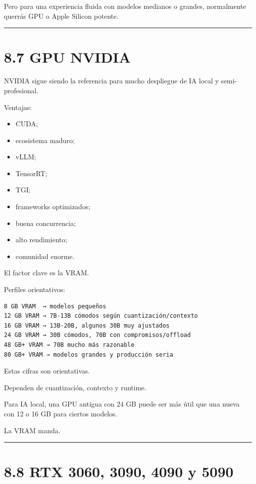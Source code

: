 Pero para una experiencia fluida con modelos medianos o grandes,
normalmente querrás GPU o Apple Silicon potente.

\begin{center}\rule{0.5\linewidth}{0.5pt}\end{center}

\section{8.7 GPU NVIDIA}\label{gpu-nvidia}

NVIDIA sigue siendo la referencia para mucho despliegue de IA local y
semi-profesional.

Ventajas:

\begin{itemize}
\tightlist
\item
  CUDA;
\item
  ecosistema maduro;
\item
  vLLM;
\item
  TensorRT;
\item
  TGI;
\item
  frameworks optimizados;
\item
  buena concurrencia;
\item
  alto rendimiento;
\item
  comunidad enorme.
\end{itemize}

El factor clave es la VRAM.

Perfiles orientativos:

\begin{lstlisting}
8 GB VRAM  → modelos pequeños
12 GB VRAM → 7B-13B cómodos según cuantización/contexto
16 GB VRAM → 13B-20B, algunos 30B muy ajustados
24 GB VRAM → 30B cómodos, 70B con compromisos/offload
48 GB+ VRAM → 70B mucho más razonable
80 GB+ VRAM → modelos grandes y producción seria
\end{lstlisting}

Estas cifras son orientativas.

Dependen de cuantización, contexto y runtime.

Para IA local, una GPU antigua con 24 GB puede ser más útil que una
nueva con 12 o 16 GB para ciertos modelos.

La VRAM manda.

\begin{center}\rule{0.5\linewidth}{0.5pt}\end{center}

\section{8.8 RTX 3060, 3090, 4090 y
5090}\label{rtx-3060-3090-4090-y-5090}

